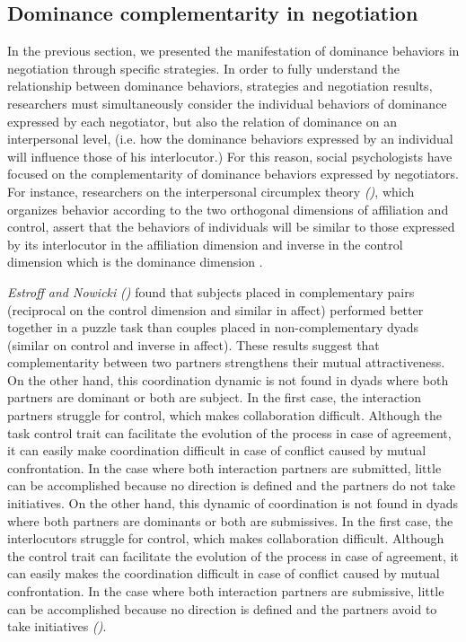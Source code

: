 \documentclass[10pt, a4paper, twocolumn]{article} %
\begin{document}
		\subsection{Dominance complementarity in negotiation}
			 In the previous section, we presented the manifestation of dominance behaviors in negotiation through specific strategies.
			 In order to fully understand the relationship between dominance behaviors, strategies and negotiation results, researchers must simultaneously consider the individual behaviors of dominance expressed by each negotiator, but also the relation of dominance on an interpersonal level, (i.e. how the dominance behaviors expressed by an individual will influence those of his interlocutor.)
				For this reason, social psychologists have focused on the complementarity of dominance behaviors expressed by negotiators. For instance, researchers on the interpersonal circumplex theory \emph{(\cites{wiggins1979psychological, kiesler19831982})}, which organizes behavior according to the two orthogonal dimensions of affiliation and control, assert that the behaviors of individuals will be similar to those expressed by its interlocutor in the affiliation dimension and inverse in the control dimension which is the dominance dimension \cite{tiedens2003power}.
				
				\emph{Estroff and Nowicki} \emph{(\cite{estroff1992interpersonal})} found that subjects placed in complementary pairs (reciprocal on the control dimension and similar in affect) performed better together in a puzzle task than couples placed in non-complementary dyads (similar on control and inverse in affect). These results suggest that complementarity between two partners strengthens their mutual attractiveness.
				On the other hand, this coordination dynamic is not found in dyads where both partners are dominant or both are subject. 
				In the first case, the interaction partners struggle for control, which makes collaboration difficult. Although the task control trait can facilitate the evolution of the process in case of agreement, it can easily make coordination difficult in case of conflict caused by mutual confrontation. In the case where both interaction partners are submitted, little can be accomplished because no direction is defined and the partners do not take initiatives.
				On the other hand, this dynamic of coordination  is not found in dyads where both partners are dominants or both are submissives. 
				In the first case, the interlocutors struggle for control, which makes collaboration difficult. Although the control trait can facilitate the evolution of the process in case of agreement, it can easily makes the coordination difficult in case of conflict caused by mutual confrontation. In the case where both interaction partners are submissive, little can be accomplished because no direction is defined and the partners avoid to take initiatives \emph{(\cite{wiltermuth2015benefits})}.
				
\end{document}
